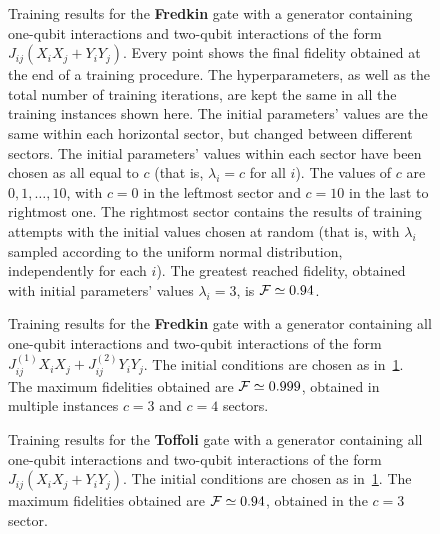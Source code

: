 \begin{figure}[tb]
	\centering
    \vspace{-40pt}
	\caption{
		Training results for the \textbf{Fredkin} gate with a generator containing one-qubit interactions and two-qubit interactions of the form $J_{ij}(X_i X_j + Y_i Y_j)$.
		Every point shows the final fidelity obtained at the end of a training procedure.
		The hyperparameters, as well as the total number of training iterations, are kept the same in all the training instances shown here.
		The initial parameters' values are the same within each horizontal sector, but changed between different sectors.
		The initial parameters' values within each sector have been chosen as all equal to $c$ (that is, $\lambda_i=c$ for all $i$). The values of $c$ are $0, 1,\ldots, 10$, with $c=0$ in the leftmost sector and $c=10$ in the last to rightmost one.
		The rightmost sector contains the results of training attempts with the initial values chosen at random (that is, with $\lambda_i$ sampled according to the uniform normal distribution, independently for each $i$).
		The greatest reached fidelity, obtained with initial parameters' values $\lambda_i=3$, is ${\mathcal{F}}\simeq0.94$.
	}
\label{fig:fredkin_XX}
\end{figure}

\begin{figure}[tb]
	\centering
	\caption{
		Training results for the \textbf{Fredkin} gate with a generator containing all one-qubit interactions and two-qubit interactions of the form $J^{(1)}_{ij}X_i X_j + J^{(2)}_{ij}Y_i Y_j$.
		The initial conditions are chosen as in~\cref{fig:fredkin_XX}.
		The maximum fidelities obtained are ${\mathcal{F}}\simeq0.999$, obtained in multiple instances $c=3$ and $c=4$ sectors.
	}
\label{fig:fredkin_XY}
\end{figure}

\begin{figure}[tb]
	\centering
	\caption{
		Training results for the \textbf{Toffoli} gate with a generator containing all one-qubit interactions and two-qubit interactions of the form $J_{ij}(X_i X_j + Y_i Y_j)$.
		The initial conditions are chosen as in~\cref{fig:fredkin_XX}.
		The maximum fidelities obtained are ${\mathcal{F}}\simeq0.94$, obtained in the $c=3$ sector.
	}
	\label{fig:toffoli_XX}
\end{figure}

